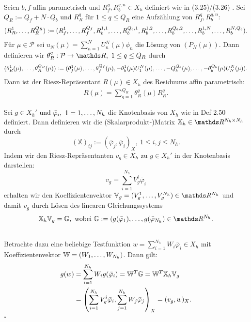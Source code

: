 Seien $b,f$ affin parametrisch und $R_f^q,R_b^{q,n}\in X_h$ definiert wie in (3.25)/(3.26) .
Sei $Q_R:= Q_f+N\cdot Q_b$ und $R_R^q$ für $1\le q\le Q_R$ eine Aufzählung von $R_f^q,R_b^{q,n}$:
\begin{align*}
(R_R^1, \dots ,R_R^{Q_R}) := (R_f^1, \dots ,R_f^{Q_f},R_b^{1,1}, \dots ,R_b^{Q_b,1},R_b^{1,2}, \dots ,R_b^{Q_b,2}, \dots ,R_b^{1,N}, \dots ,R_b^{N,Q_b}).
\end{align*}
Für $\mu\in\mathcal{P}$ sei $u_N(\mu) = \sum_{n=1}^{N} U_n^N(\mu) \phi_n$ die Lösung von $(P_N(\mu))$.
Dann definieren wir $\theta_R^q: \mathcal{P}\to \R,~1\le q\le Q_R$ durch
\begin{align*}
(\theta_R^1(\mu), \dots ,\theta_R^{Q_R}(\mu)) := (\theta_f^1(\mu), \dots ,\theta_f^{Q_f}(\mu), -\theta_b^1(\mu)U_1^N(\mu), \dots , -Q_b^{Q_b}(\mu), \dots , -\theta_b^{Q_b}(\mu)U_N^N(\mu)).
\end{align*}
Dann ist der Riesz-Repräsentant $R(\mu)\in X_h$ des Residuums affin parametrisch:
\begin{align*}
R(\mu) = \sum_{q=1}^{Q_R} \theta_R^q(\mu)R_R^q.
\end{align*}

Sei $g\in X_h'$ und $\bar{\varphi}_i,~1=1, \dots ,N_h$ die Knotenbasis von $X_h$ wie in Def 2.50 definiert.
Dann definieren wir die (Skalarprodukt-)Matrix $\mathbb{X}_h\in\R^{N_h\times N_h}$ durch
\[
(\mathbb{X})_{ij} := (\bar{\varphi}_j,\bar{\varphi}_i)_X,~1\le i,j\le N_h.
\]
Indem wir den Riesz-Repräsentanten $v_g\in X_h$ zu $g\in X_h'$ in der Knotenbasis darstellen:
\[
v_g = \sum_{i=1}^{N_h} V_g^i \bar{\varphi}_i
\]
erhalten wir den Koeffizientenvektor $\mathbb{V}_g= (V_g^1\dt{,}V_g^{N_h})\in \R^{N_h}$ und damit $v_g$ durch Lösen des linearen Gleichungssystems
\[
\mathbb{X}_h\mathbb{V}_g = \mathbb{G},\text{ wobei } \mathbb{G} := (g(\bar{\varphi}_1)\dt{,}g(\bar{\varphi}_{N_h})\in \R^{N_h}.
\]

\\
Betrachte dazu eine beliebige Testfunktion $w = \sum_{i=1}^{N_h} W_i\bar{\varphi}_i\in X_h$ mit Koeffizientenvektor $\mathbb{W} = (W_1, \dots ,W_{N_h})$.
Dann gilt:
\begin{align*}
g(w) &= \sum_{i=1}^{N_h} W_i g(\bar{\varphi}_i) = \mathbb{W}^T \mathbb{G} = \mathbb{W}^T\mathbb{X}_h\mathbb{V}_g\\
&= \left( \sum_{i=1}^{N_h} V_g^i \bar{\varphi}_i,\sum_{j=1}^{N_h} W_j \bar{\varphi}_j\right)_X = (v_g,w)_X.
\end{align*}
\hfill $\square$\\

